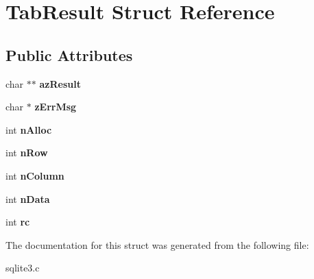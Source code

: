 \hypertarget{struct_tab_result}{\section{Tab\-Result Struct Reference}
\label{struct_tab_result}
}
\subsection*{Public Attributes}
\begin{DoxyCompactItemize}
\item 
\hypertarget{struct_tab_result_a7446a22a7b39c17e447c65ba200490a6}{char $\ast$$\ast$ {\bfseries az\-Result}}\label{struct_tab_result_a7446a22a7b39c17e447c65ba200490a6}

\item 
\hypertarget{struct_tab_result_a6e7104bb622be05f16b6470dbb68a6c7}{char $\ast$ {\bfseries z\-Err\-Msg}}\label{struct_tab_result_a6e7104bb622be05f16b6470dbb68a6c7}

\item 
\hypertarget{struct_tab_result_a6a1d5bc64a1eeef54b56cb2602b663b2}{int {\bfseries n\-Alloc}}\label{struct_tab_result_a6a1d5bc64a1eeef54b56cb2602b663b2}

\item 
\hypertarget{struct_tab_result_ae803d6f07364c9e03bee8abd13056e1b}{int {\bfseries n\-Row}}\label{struct_tab_result_ae803d6f07364c9e03bee8abd13056e1b}

\item 
\hypertarget{struct_tab_result_a44237b9ab33cdbca7a5a158470ebcaa3}{int {\bfseries n\-Column}}\label{struct_tab_result_a44237b9ab33cdbca7a5a158470ebcaa3}

\item 
\hypertarget{struct_tab_result_a959e8dd3348f76e4cdabad9c89ee62d1}{int {\bfseries n\-Data}}\label{struct_tab_result_a959e8dd3348f76e4cdabad9c89ee62d1}

\item 
\hypertarget{struct_tab_result_a44bb015ce660ed3f987e324919d73f4d}{int {\bfseries rc}}\label{struct_tab_result_a44bb015ce660ed3f987e324919d73f4d}

\end{DoxyCompactItemize}


The documentation for this struct was generated from the following file\-:\begin{DoxyCompactItemize}
\item 
sqlite3.\-c\end{DoxyCompactItemize}
